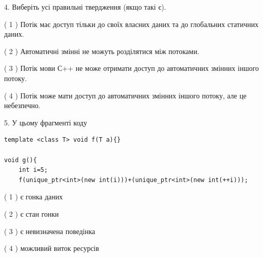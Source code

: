 \documentclass[12pt, ukrainian]{article}
\begin{document}
\begin {large}
{%
4. Виберіть усі правильні твердження (якщо такі є).\par
\vspace{2mm}

( 1 ) Потік має доступ тільки до своїх власних даних та до глобальних статичних даних.%

( 2 ) Автоматичні змінні не можуть розділятися між потоками.%

( 3 ) Потік мови С++ не може отримати доступ до автоматичних змінних іншого потоку.%

( 4 ) Потік може мати доступ до автоматичних змінних іншого потоку, але це небезпечно.%


5. У цьому фрагменті коду
\begin{verbatim}
template <class T> void f(T a){}

void g(){
    int i=5;
    f(unique_ptr<int>(new int(i)))+(unique_ptr<int>(new int(++i)));
\end{verbatim}
( 1 ) є гонка даних%

( 2 ) є стан гонки%

( 3 ) є невизначена поведінка%

( 4 ) можливий виток ресурсів%
}
\end {large}
\end{document}
